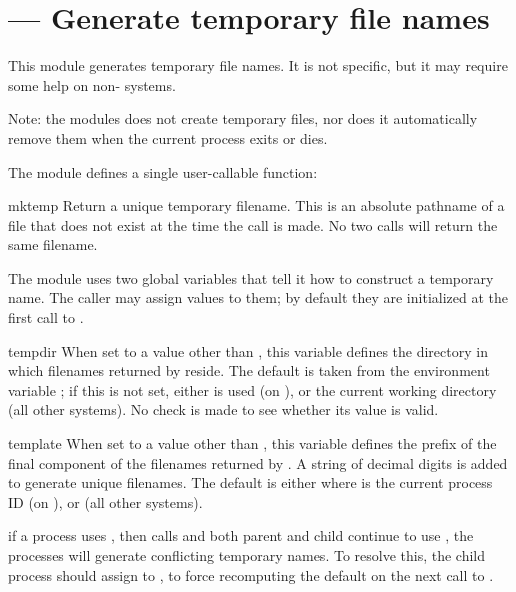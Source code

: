 \section{ ---
         Generate temporary file names}




This module generates temporary file names.  It is not \UNIX{} specific,
but it may require some help on non-\UNIX{} systems.

Note: the modules does not create temporary files, nor does it
automatically remove them when the current process exits or dies.

The module defines a single user-callable function:

\begin{funcdesc}{mktemp}{}
Return a unique temporary filename.  This is an absolute pathname of a
file that does not exist at the time the call is made.  No two calls
will return the same filename.
\end{funcdesc}

The module uses two global variables that tell it how to construct a
temporary name.  The caller may assign values to them; by default they
are initialized at the first call to .

\begin{datadesc}{tempdir}
When set to a value other than , this variable defines the
directory in which filenames returned by  reside.
The default is taken from the environment variable ; if
this is not set, either  is used (on \UNIX{}), or the
current working directory (all other systems).  No check is made to
see whether its value is valid.
\end{datadesc}

\begin{datadesc}{template}
When set to a value other than , this variable defines the
prefix of the final component of the filenames returned by
.  A string of decimal digits is added to generate
unique filenames.  The default is either  where
 is the current process ID (on \UNIX{}), or  (all
other systems).
\end{datadesc}

 if a \UNIX{} process uses , then
calls  and both parent and child continue to use
, the processes will generate conflicting temporary
names.  To resolve this, the child process should assign  to
, to force recomputing the default on the next call
to .
